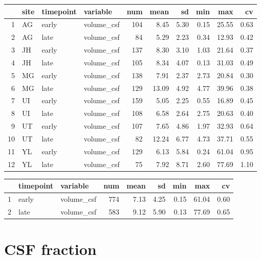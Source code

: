 \documentclass[
]{article}
\begin{document}
\begin{table}[ht]
\centering
\begin{tabular}{rlllrrrrrr}
  \hline
 & site & timepoint & variable & num & mean & sd & min & max & cv \\ 
  \hline
1 & AG & early & volume\_csf & 104 & 8.45 & 5.30 & 0.15 & 25.55 & 0.63 \\ 
  2 & AG & late & volume\_csf &  84 & 5.29 & 2.23 & 0.34 & 12.93 & 0.42 \\ 
  3 & JH & early & volume\_csf & 137 & 8.30 & 3.10 & 1.03 & 21.64 & 0.37 \\ 
  4 & JH & late & volume\_csf & 105 & 8.34 & 4.07 & 0.13 & 31.03 & 0.49 \\ 
  5 & MG & early & volume\_csf & 138 & 7.91 & 2.37 & 2.73 & 20.84 & 0.30 \\ 
  6 & MG & late & volume\_csf & 129 & 13.09 & 4.92 & 4.77 & 39.96 & 0.38 \\ 
  7 & UI & early & volume\_csf & 159 & 5.05 & 2.25 & 0.55 & 16.89 & 0.45 \\ 
  8 & UI & late & volume\_csf & 108 & 6.58 & 2.64 & 2.75 & 20.63 & 0.40 \\ 
  9 & UT & early & volume\_csf & 107 & 7.65 & 4.86 & 1.97 & 32.93 & 0.64 \\ 
  10 & UT & late & volume\_csf &  82 & 12.24 & 6.77 & 4.73 & 37.71 & 0.55 \\ 
  11 & YL & early & volume\_csf & 129 & 6.13 & 5.84 & 0.24 & 61.04 & 0.95 \\ 
  12 & YL & late & volume\_csf &  75 & 7.92 & 8.71 & 2.60 & 77.69 & 1.10 \\ 
   \hline
\end{tabular}
\end{table}
\begin{table}[ht]
\centering
\begin{tabular}{rllrrrrrr}
  \hline
 & timepoint & variable & num & mean & sd & min & max & cv \\ 
  \hline
1 & early & volume\_csf & 774 & 7.13 & 4.25 & 0.15 & 61.04 & 0.60 \\ 
  2 & late & volume\_csf & 583 & 9.12 & 5.90 & 0.13 & 77.69 & 0.65 \\ 
   \hline
\end{tabular}
\end{table}

\hypertarget{csf-fraction}{%
\section{CSF fraction}\label{csf-fraction}}
\end{document}
